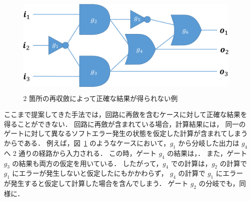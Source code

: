 \begin{figure}[tbp]
  \begin{center}
    \includegraphics[height=50mm,clip]{img/join.pdf}
  \end{center}
  \caption{2 箇所の再収斂によって正確な結果が得られない例}
  \label{fig:join}
\end{figure}
ここまで提案してきた手法では，回路に再斂を含むケースに対して正確な結果を得ることができない．
回路に再斂が含まれている場合，計算結果には，
同一のゲートに対して異なるソフトエラー発生の状態を仮定した計算が含まれてしまうからである．
例えば，図~\ref{fig:join} のようなケースにおいて，$g_1$ から分岐した出力は $g_4$ へ 2 通りの経路から入力される．
この時，ゲート $g_4$ の結果は，．
また，ゲート $g_3$ の結果も両方の仮定を用いている．
したがって，$g_4$ での計算は，$g_2$ の計算で $g_1$ にエラーが発生しないと仮定したにもかかわらず，
$g_4$ の計算で $g_1$ にエラーが発生すると仮定して計算した場合を含んでしまう．
ゲート $g_2$ の分岐でも，同様に．

